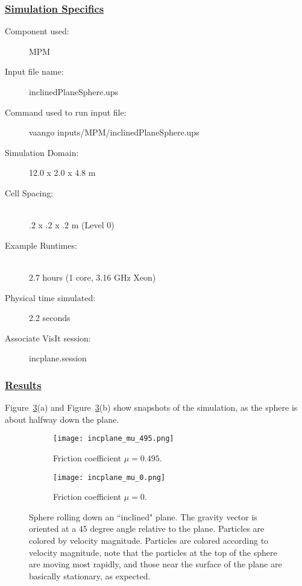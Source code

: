 \subsubsection*{\underline{Simulation Specifics}}
\begin{description} 
\item [Component used:] \hfill MPM
\item [Input file name:] \hfill inclinedPlaneSphere.ups
\item [Command used to run input file:]\hfill vaango inputs/MPM/inclinedPlaneSphere.ups
\item [Simulation Domain:]\hfill    12.0 x 2.0 x 4.8 m

\item [Cell Spacing:]\hfill \\ 
.2 x .2 x .2 m (Level 0)

\item [Example Runtimes:] \hfill \\
 2.7 hours  (1 core, 3.16 GHz Xeon)\\

\item [Physical time simulated:] \hfill 2.2 seconds

\item [Associate VisIt session:] \hfill incplane.session

\end{description}

\subsubsection*{\underline{Results}}
Figure~\ref{figincplaneSphere}(a) and Figure~\ref{figincplaneSphere}(b)
show snapshots of the simulation, as
the sphere is about halfway down the plane.
\begin{figure}
  \centering
  \begin{subfigure}{0.4\textwidth}
    \texttt{[image: incplane\_mu\_495.png]}
    \caption{Friction coefficient $\mu = 0.495$.}
    \label{figincplaneSphere_bigmu}
  \end{subfigure}
  \begin{subfigure}{0.4\textwidth}
    \texttt{[image: incplane\_mu\_0.png]}
    \caption{Friction coefficient $\mu = 0$.}
    \label{figincplaneSphere_0mu}
  \end{subfigure}
  \caption{Sphere rolling down an ``inclined" plane.  The gravity vector
is oriented at a 45 degree angle relative to the plane.  Particles are colored
by velocity magnitude. 
Particles are colored according
to velocity magnitude, note that the particles at the top of the sphere
are moving most rapidly, and those near the surface of the plane are 
basically stationary, as expected.}
  \label{figincplaneSphere}
\end{figure}

